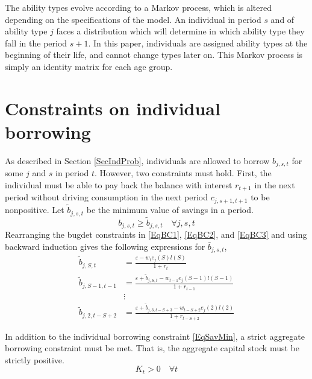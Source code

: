 \documentclass[letterpaper,12pt]{article}
\theoremstyle{definition}
\newcommand\ve{\varepsilon}
\begin{document}
  The ability types evolve according to a Markov process, which is altered depending on the specifications of the model.  An individual in period $s$ and of ability type $j$ faces a distribution which will determine in which ability type they fall in the period $s+1$.  In this paper, individuals are assigned ability types at the beginning of their life, and cannot change types later on.  This Markov process is simply an identity matrix for each age group.



\newpage
\section{Constraints on individual borrowing}\label{AppBorConstr}

  \setcounter{equation}{0}

  As described in Section \ref{SecIndProb}, individuals are allowed to borrow $b_{j,s,t}$ for some $j$ and $s$ in period $t$. However, two constraints must hold. First, the individual must be able to pay back the balance with interest $r_{t+1}$ in the next period without driving consumption in the next period $c_{j,s+1,t+1}$ to be nonpositive. Let $\tilde{b}_{j,s,t}$ be the minimum value of savings in a period.
  \begin{equation}\label{EqSavMin}
    b_{j,s,t}\geq\tilde{b}_{j,s,t} \quad\forall j,s,t
  \end{equation}
  Rearranging the bugdet constraints in \eqref{EqBC1}, \eqref{EqBC2}, and \eqref{EqBC3} and using backward induction gives the following expressions for $\bar{b}_{j,s,t}$,
  \begin{equation}\label{EqBorConsts}
    \begin{split}
      \tilde{b}_{j,S,t} &= \frac{\ve - w_te_j(S)l(S)}{1+r_t}  \\
      \tilde{b}_{j,S-1,t-1} &= \frac{\ve + \tilde{b}_{j,S,t} - w_{t-1}e_j(S-1)l(S-1)}{1+r_{t-1}} \\
      &\vdots \\
      \tilde{b}_{j,2,t-S+2} &= \frac{\ve + \tilde{b}_{j,3,t-S+3} - w_{t-S+2}e_j(2)l(2)}{1+r_{t-S+2}}
    \end{split}
  \end{equation}

  In addition to the individual borrowing constraint \eqref{EqSavMin}, a strict aggregate borrowing constraint must be met. That is, the aggregate capital stock must be strictly positive.
  \begin{equation}\label{EqAggrCapConstr}
    K_t > 0 \quad\forall t
  \end{equation}
\end{document}
